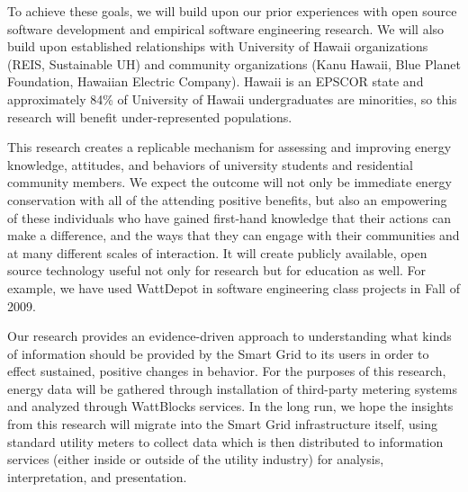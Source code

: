 To achieve these goals, we will build upon our prior experiences with open
source software development and empirical software engineering research. We
will also build upon established relationships with University of Hawaii
organizations (REIS, Sustainable UH) and community organizations (Kanu
Hawaii, Blue Planet Foundation, Hawaiian Electric Company).  Hawaii
is an EPSCOR state and approximately 84\% of University of Hawaii
undergraduates are minorities, so this research will benefit
under-represented populations. 

This research creates a replicable mechanism for assessing and improving
energy knowledge, attitudes, and behaviors of university students and
residential community members. We expect the outcome will not only be
immediate energy conservation with all of the attending positive benefits,
but also an empowering of these individuals who have gained first-hand
knowledge that their actions can make a difference, and the ways that they
can engage with their communities and at many different scales of
interaction.  It will create publicly available, open source technology
useful not only for research but for education as well.  For example, we
have used WattDepot in software engineering class projects in Fall of 2009.

Our research provides an evidence-driven approach to understanding what
kinds of information should be provided by the Smart Grid to its users in
order to effect sustained, positive changes in behavior.  For the purposes
of this research, energy data will be gathered through installation of
third-party metering systems and analyzed through WattBlocks services. In
the long run, we hope the insights from this research will migrate into the Smart
Grid infrastructure itself, using standard utility meters to collect data
which is then distributed to information services (either inside or outside
of the utility industry) for analysis, interpretation, and presentation.

